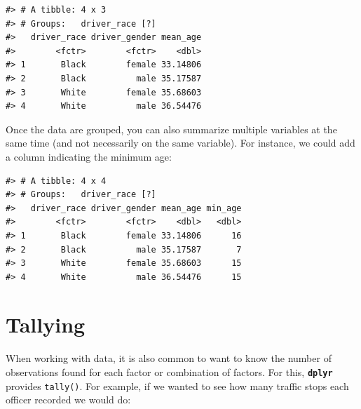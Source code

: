 \documentclass[]{book}
\newenvironment{Shaded}{\begin{snugshade}}{\end{snugshade}}
\newcommand{\KeywordTok}[1]{\textcolor[rgb]{0.13,0.29,0.53}{\textbf{#1}}}
\newcommand{\DataTypeTok}[1]{\textcolor[rgb]{0.13,0.29,0.53}{#1}}
\newcommand{\StringTok}[1]{\textcolor[rgb]{0.31,0.60,0.02}{#1}}
\newcommand{\OtherTok}[1]{\textcolor[rgb]{0.56,0.35,0.01}{#1}}
\newcommand{\OperatorTok}[1]{\textcolor[rgb]{0.81,0.36,0.00}{\textbf{#1}}}
\newcommand{\NormalTok}[1]{#1}
\theoremstyle{definition}
\theoremstyle{definition}
\theoremstyle{definition}
\theoremstyle{remark}
\begin{document}
\begin{verbatim}
#> # A tibble: 4 x 3
#> # Groups:   driver_race [?]
#>   driver_race driver_gender mean_age
#>        <fctr>        <fctr>    <dbl>
#> 1       Black        female 33.14806
#> 2       Black          male 35.17587
#> 3       White        female 35.68603
#> 4       White          male 36.54476
\end{verbatim}

Once the data are grouped, you can also summarize multiple variables at
the same time (and not necessarily on the same variable). For instance,
we could add a column indicating the minimum age:

\begin{Shaded}
\end{Shaded}

\begin{verbatim}
#> # A tibble: 4 x 4
#> # Groups:   driver_race [?]
#>   driver_race driver_gender mean_age min_age
#>        <fctr>        <fctr>    <dbl>   <dbl>
#> 1       Black        female 33.14806      16
#> 2       Black          male 35.17587       7
#> 3       White        female 35.68603      15
#> 4       White          male 36.54476      15
\end{verbatim}

\section{Tallying}\label{tallying}

When working with data, it is also common to want to know the number of
observations found for each factor or combination of factors. For this,
\textbf{\texttt{dplyr}} provides \texttt{tally()}. For example, if we
wanted to see how many traffic stops each officer recorded we would do:

\begin{Shaded}
\end{Shaded}
\end{document}
